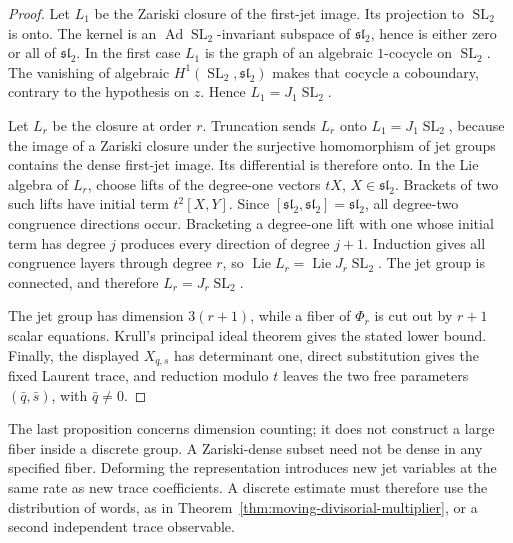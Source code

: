 \documentclass[11pt,reqno]{amsart}
\theoremstyle{definition}
\theoremstyle{remark}
\newcommand{\SL}{\operatorname{SL}}
\newcommand{\Ad}{\operatorname{Ad}}
\begin{document}
\begin{proof}
Let \(L_1\) be the Zariski closure of the first-jet image.  Its projection
to \(\SL_2\) is onto.  The kernel is an
\(\Ad\SL_2\)-invariant subspace of \(\mathfrak{sl}_2\), hence is either
zero or all of \(\mathfrak{sl}_2\).  In the first case \(L_1\) is the
graph of an algebraic \(1\)-cocycle on \(\SL_2\).  The vanishing of
algebraic \(H^1(\SL_2,\mathfrak{sl}_2)\) makes that cocycle a coboundary,
contrary to the hypothesis on \(z\).  Hence \(L_1=J_1\SL_2\).

Let \(L_r\) be the closure at order \(r\).  Truncation sends \(L_r\) onto
\(L_1=J_1\SL_2\), because the image of a Zariski closure under the
surjective homomorphism of jet groups contains the dense first-jet image.
Its differential is therefore onto.  In the Lie algebra of \(L_r\), choose
lifts of the degree-one vectors \(tX\), \(X\in\mathfrak{sl}_2\).
Brackets of two such lifts have initial term \(t^2[X,Y]\).  Since
\([\mathfrak{sl}_2,\mathfrak{sl}_2]=\mathfrak{sl}_2\), all degree-two
congruence directions occur.  Bracketing a degree-one lift with one whose
initial term has degree \(j\) produces every direction of degree \(j+1\).
Induction gives all congruence layers through degree \(r\), so
\(\operatorname{Lie}L_r=\operatorname{Lie}J_r\SL_2\).  The jet group is
connected, and therefore \(L_r=J_r\SL_2\).

The jet group has dimension \(3(r+1)\), while a fiber of \(\Phi_r\) is cut
out by \(r+1\) scalar equations.  Krull's principal ideal theorem gives
the stated lower bound.  Finally, the displayed \(X_{q,s}\) has determinant
one, direct substitution gives the fixed Laurent trace, and reduction
modulo \(t\) leaves the two free parameters \((\bar q,\bar s)\), with
\(\bar q\ne0\).
\end{proof}

The last proposition concerns dimension counting; it does not construct a
large fiber inside a discrete group.  A Zariski-dense subset need not be
dense in any specified fiber.  Deforming the
representation introduces new jet variables at the same rate as new trace
coefficients.  A discrete estimate must therefore use the distribution of
words, as in Theorem~\ref{thm:moving-divisorial-multiplier}, or a second
independent trace observable.
\end{document}

